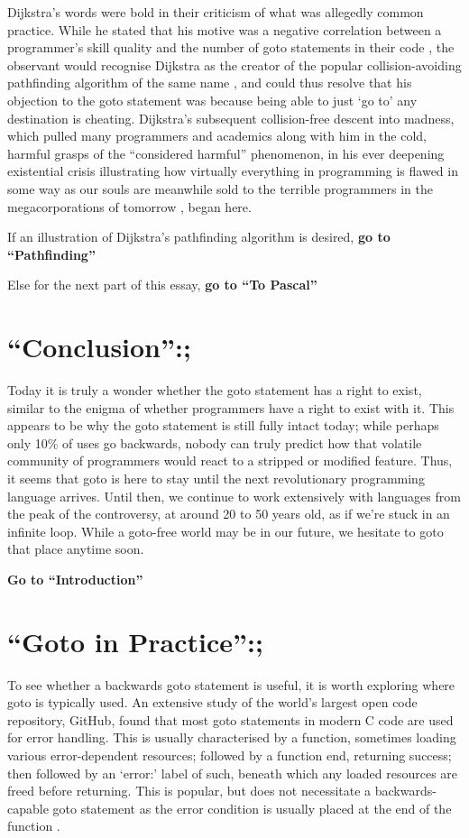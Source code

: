 \documentclass{journal}
\begin{document}
Dijkstra's words were bold in their criticism of what was allegedly common practice. While he stated that his motive was a negative correlation between a programmer's skill quality and the number of goto statements in their code \cite{goto, humanprogramming}, the observant would recognise Dijkstra as the creator of the popular collision-avoiding pathfinding algorithm of the same name \cite{pathfinding}, and could thus resolve that his objection to the goto statement was because being able to just `go to' any destination is cheating. Dijkstra's subsequent collision-free descent into madness, which pulled many programmers and academics along with him in the cold, harmful grasps of the ``considered harmful'' phenomenon, in his ever deepening existential crisis illustrating how virtually everything in programming is flawed in some way as our souls are meanwhile sold to the terrible programmers in the megacorporations of tomorrow \cite{truths}, began here.

If an illustration of Dijkstra's pathfinding algorithm is desired, \textbf{go to ``Pathfinding''}

Else for the next part of this essay, \textbf{go to ``To Pascal''}

\setcounter{section}{4}
\section{``Conclusion'':;}
Today it is truly a wonder whether the goto statement has a right to exist, similar to the enigma of whether programmers have a right to exist with it. This appears to be why the goto statement is still fully intact today; while perhaps only 10\% of uses \cite{github} go backwards, nobody can truly predict how that volatile community of programmers would react to a stripped or modified feature. Thus, it seems that goto is here to stay until the next revolutionary programming language arrives. Until then, we continue to work extensively with languages from the peak of the controversy, at around 20 to 50 years old, as if we're stuck in an infinite loop. While a goto-free world may be in our future, we hesitate to goto that place anytime soon.

\textbf{Go to ``Introduction''}

\setcounter{section}{3}
\section{``Goto in Practice'':;}
To see whether a backwards goto statement is useful, it is worth exploring where goto is typically used. An extensive study \cite{gotostudy} of the world's largest \cite{github} open code repository, GitHub, found that most goto statements in modern C code are used for error handling. This is usually characterised by a function, sometimes loading various error-dependent resources; followed by a function end, returning success; then followed by an `error:' label of such, beneath which any loaded resources are freed before returning. This is popular, but does not necessitate a backwards-capable goto statement as the error condition is usually placed at the end of the function \cite{gotostudy}.
\end{document}
